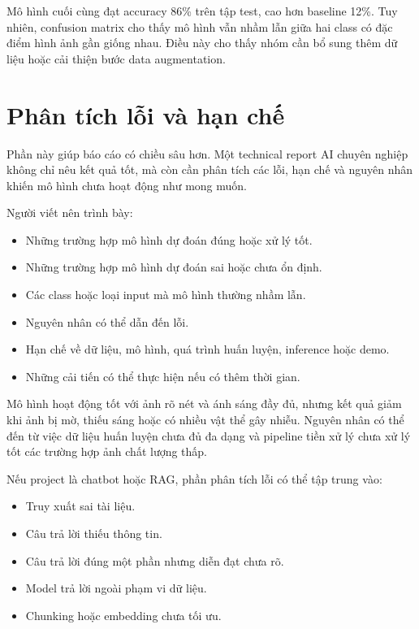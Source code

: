\documentclass[12pt]{ai_conquer2026}
\begin{document}
\begin{aivncodebox}[Ví dụ:]
Mô hình cuối cùng đạt accuracy 86\% trên tập test, cao hơn baseline 12\%. Tuy nhiên, confusion matrix cho thấy mô hình vẫn nhầm lẫn giữa hai class có đặc điểm hình ảnh gần giống nhau. Điều này cho thấy nhóm cần bổ sung thêm dữ liệu hoặc cải thiện bước data augmentation.
\end{aivncodebox}

\section{Phân tích lỗi và hạn chế}

Phần này giúp báo cáo có chiều sâu hơn. Một technical report AI chuyên nghiệp không chỉ nêu kết quả tốt, mà còn cần phân tích các lỗi, hạn chế và nguyên nhân khiến mô hình chưa hoạt động như mong muốn.

Người viết nên trình bày:

\begin{itemize}
\item Những trường hợp mô hình dự đoán đúng hoặc xử lý tốt.
\item Những trường hợp mô hình dự đoán sai hoặc chưa ổn định.
\item Các class hoặc loại input mà mô hình thường nhầm lẫn.
\item Nguyên nhân có thể dẫn đến lỗi.
\item Hạn chế về dữ liệu, mô hình, quá trình huấn luyện, inference hoặc demo.
\item Những cải tiến có thể thực hiện nếu có thêm thời gian.
\end{itemize}



\begin{aivncodebox}[Ví dụ:]
Mô hình hoạt động tốt với ảnh rõ nét và ánh sáng đầy đủ, nhưng kết quả giảm khi ảnh bị mờ, thiếu sáng hoặc có nhiều vật thể gây nhiễu. Nguyên nhân có thể đến từ việc dữ liệu huấn luyện chưa đủ đa dạng và pipeline tiền xử lý chưa xử lý tốt các trường hợp ảnh chất lượng thấp.
\end{aivncodebox}

\newpage

\begin{aivncodebox}[Ví dụ:]
Nếu project là chatbot hoặc RAG, phần phân tích lỗi có thể tập trung vào:
\begin{itemize}
\item Truy xuất sai tài liệu.
\item Câu trả lời thiếu thông tin.
\item Câu trả lời đúng một phần nhưng diễn đạt chưa rõ.
\item Model trả lời ngoài phạm vi dữ liệu.
\item Chunking hoặc embedding chưa tối ưu.
\end{itemize}
\end{aivncodebox}
\end{document}
